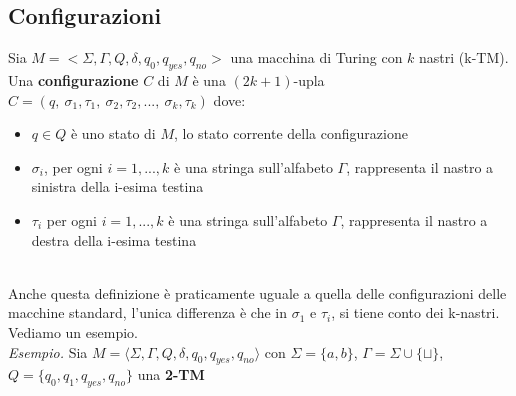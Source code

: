 \subsection{Configurazioni}
\colorbox{SALZO}{\parbox{\dimexpr\linewidth-2\fboxsep}{\begin{definition}
   Sia $M = <  \Sigma, \Gamma, Q,\delta,q_0,q_{yes}, q_{no}>$ una macchina di Turing con $k$ nastri (k-TM). 
   Una \textbf{configurazione} $C$ di $M$ è una $(2k +1)$-upla $C = (q,\ \sigma_1,\tau_1, \ \sigma_2, \tau_2,...,\ \sigma_k,\tau_k)$ dove:
   \begin{itemize}
    \item $q \in Q$ è uno stato di $M$, lo stato corrente della configurazione
    \item $\sigma_i$, per ogni $i = 1,...,k$ è una stringa sull'alfabeto $\Gamma$, rappresenta il nastro a sinistra della i-esima testina
    \item $\tau_i$ per ogni $i = 1,...,k$ è una stringa sull'alfabeto $\Gamma$, rappresenta il nastro a destra della i-esima testina
   \end{itemize}
\end{definition}}}\smallskip\\
Anche questa definizione è praticamente uguale a quella delle configurazioni delle macchine standard, l'unica differenza è che in $\sigma_1$ e $\tau_i$,
si tiene conto dei k-nastri. Vediamo un esempio.\smallskip\\
\textit{Esempio.} Sia $M = \langle \Sigma, \Gamma, Q, \delta, q_0, q_{yes}, q_{no} \rangle$ con $\Sigma = \{a, b\}$, $\Gamma = \Sigma \cup \{\sqcup\}$, $Q = \{q_0, q_1, q_{yes}, q_{no}\}$ una \textbf{2-TM}

